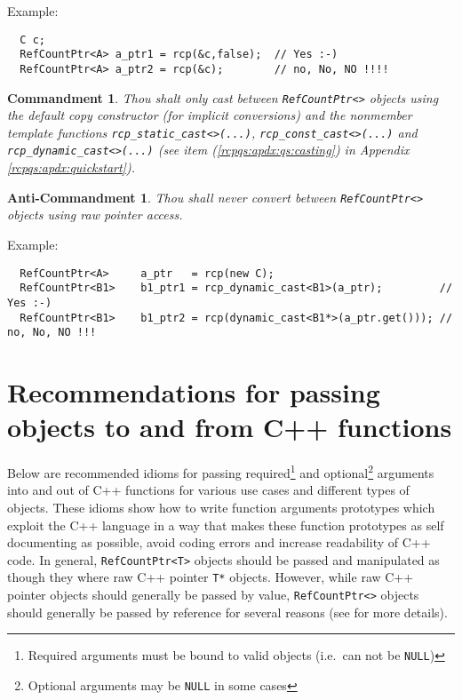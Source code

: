 \documentclass[pdf,ps2pdf,11pt]{SANDreport}
\newtheorem{commandment}{Commandment}
\newtheorem{anticommandment}{Anti-Commandment}
\begin{document}
{}\noindent{}Example:
{\small\begin{verbatim}
  C c;
  RefCountPtr<A> a_ptr1 = rcp(&c,false);  // Yes :-)
  RefCountPtr<A> a_ptr2 = rcp(&c);        // no, No, NO !!!!
\end{verbatim}}

\begin{commandment}\label{rcp:cmnd:converstion}
Thou shalt only cast between {}\texttt{Ref\-Count\-Ptr<>} objects
using the default copy constructor (for implicit conversions) and the
nonmember template functions
{}\texttt{rcp\-\_static\-\_cast<>(\-...)},
{}\texttt{rcp\-\_const\-\_cast<>(\-...)} and
{}\texttt{rcp\-\_dynamic\-\_cast<>(\-...)}  (see item
({}\ref{rcpqs:apdx:qs:casting}) in Appendix
{}\ref{rcpqs:apdx:quickstart}).
\end{commandment}

\begin{anticommandment}
Thou shall never convert between {}\texttt{Ref\-Count\-Ptr<>} objects
using raw pointer access.
\end{anticommandment}

{}\noindent{}Example:
{\small\begin{verbatim}
  RefCountPtr<A>     a_ptr   = rcp(new C);
  RefCountPtr<B1>    b1_ptr1 = rcp_dynamic_cast<B1>(a_ptr);         // Yes :-)
  RefCountPtr<B1>    b1_ptr2 = rcp(dynamic_cast<B1*>(a_ptr.get())); // no, No, NO !!!
\end{verbatim}}

%
\section{Recommendations for passing objects to and from C++ functions}
\label{rcpqs:apdx:passing-args}
%

Below are recommended idioms for passing required\footnote{Required
arguments must be bound to valid objects (i.e.~can not be
{}\texttt{NULL})} and optional\footnote{Optional arguments may be
{}\texttt{NULL} in some cases} arguments into and out of C++ functions
for various use cases and different types of objects.  These idioms
show how to write function arguments prototypes which exploit the C++
language in a way that makes these function prototypes as self
documenting as possible, avoid coding errors and increase readability
of C++ code.  In general, {}\texttt{Ref\-Count\-Ptr<T>} objects should
be passed and manipulated as though they where raw C++ pointer
{}\texttt{T*} objects.  However, while raw C++ pointer objects should
generally be passed by value, {}\texttt{Ref\-Count\-Ptr<>} objects
should generally be passed by reference for several reasons (see
{}\cite{ref:RefCountPtr} for more details).
\end{document}
